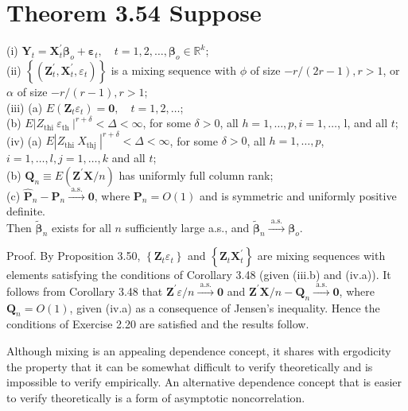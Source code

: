 \documentclass[10pt]{article}
\begin{document}
\section*{Theorem 3.54 Suppose}
(i) $\mathbf{Y}_{t}=\mathbf{X}_{t}^{\prime} \boldsymbol{\beta}_{o}+\boldsymbol{\varepsilon}_{t}, \quad t=1,2, \ldots, \boldsymbol{\beta}_{o} \in \mathbb{R}^{k}$;\\
(ii) $\left\{\left(\mathbf{Z}_{t}^{\prime}, \mathbf{X}_{t}^{\prime}, \varepsilon_{t}\right)\right\}$ is a mixing sequence with $\phi$ of size $-r /(2 r-1), r>1$, or $\alpha$ of size $-r /(r-1), r>1$;\\
(iii) (a) $E\left(\mathbf{Z}_{t} \varepsilon_{t}\right)=\mathbf{0}, \quad t=1,2, \ldots$;\\
(b) $E\left|Z_{\text {thi }} \varepsilon_{\text {th }}\right|^{r+\delta}<\Delta<\infty$, for some $\delta>0$, all $h=1, \ldots, p, i= 1, \ldots$, l, and all $t$;\\
(iv) (a) $E\left|Z_{\text {thi }} X_{\text {thj }}\right|^{r+\delta}<\Delta<\infty$, for some $\delta>0$, all $h=1, \ldots, p$, $i=1, \ldots, l, j=1, \ldots, k$ and all $t$;\\
(b) $\mathbf{Q}_{n} \equiv E\left(\mathbf{Z}^{\prime} \mathbf{X} / n\right)$ has uniformly full column rank;\\
(c) $\hat{\mathbf{P}}_{n}-\mathbf{P}_{n} \xrightarrow{\text { a.s. }} \mathbf{0}$, where $\mathbf{P}_{n}=O(1)$ and is symmetric and uniformly positive definite.\\
Then $\tilde{\boldsymbol{\beta}}_{n}$ exists for all $n$ sufficiently large a.s., and $\tilde{\boldsymbol{\beta}}_{n} \xrightarrow{\text { a.s. }} \boldsymbol{\beta}_{o}$.

Proof. By Proposition 3.50, $\left\{\mathbf{Z}_{t} \varepsilon_{t}\right\}$ and $\left\{\mathbf{Z}_{t} \mathbf{X}_{t}^{\prime}\right\}$ are mixing sequences with elements satisfying the conditions of Corollary 3.48 (given (iii.b) and (iv.a)). It follows from Corollary 3.48 that $\mathbf{Z}^{\prime} \varepsilon / n \xrightarrow{\text { a.s. }} \mathbf{0}$ and $\mathbf{Z}^{\prime} \mathbf{X} / n- \mathbf{Q}_{n} \xrightarrow{\text { a.s. }} \mathbf{0}$, where $\mathbf{Q}_{n}=O(1)$, given (iv.a) as a consequence of Jensen's inequality. Hence the conditions of Exercise 2.20 are satisfied and the results follow.

Although mixing is an appealing dependence concept, it shares with ergodicity the property that it can be somewhat difficult to verify theoretically and is impossible to verify empirically. An alternative dependence concept that is easier to verify theoretically is a form of asymptotic noncorrelation.
\end{document}
